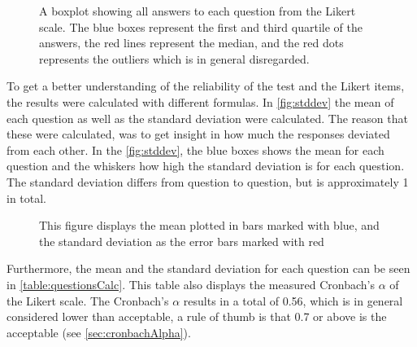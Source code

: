 \begin{figure}[H]
	
	\centering
	\caption{A boxplot showing all answers to each question from the Likert scale. The blue boxes represent the first and third quartile of the answers, the red lines represent the median, and the red dots represents the outliers which is in general disregarded.}
	\label{fig:boxploteval}
\end{figure}

To get a better understanding of the reliability of the test and the Likert items, the results were calculated with different formulas. In \autoref{fig:stddev} the mean of each question as well as the standard deviation were calculated. The reason that these were calculated, was to get insight in how much the responses deviated from each other. In the \autoref{fig:stddev}, the blue boxes shows the mean for each question and the whiskers how high the standard deviation is for each question. The standard deviation differs from question to question, but is approximately 1 in total.
\begin{figure}[H]
	
	\centering
	\caption{This figure displays the mean plotted in bars marked with blue, and the standard deviation as the error bars marked with red}
	\label{fig:stddev}
\end{figure}



Furthermore, the mean and the standard deviation for each question can be seen in \autoref{table:questionsCalc}. This table also displays the measured Cronbach's $\alpha$ of the Likert scale. The Cronbach's $\alpha$ results in a total of 0.56, which is in general considered lower than acceptable, a rule of thumb is that 0.7 or above is the acceptable (see \autoref{sec:cronbachAlpha}). 


